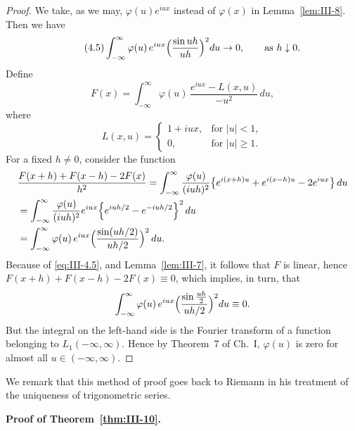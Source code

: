 \begin{proof}
We take, as we may, $\varphi(u)e^{iux}$ instead of $\varphi(x)$ in Lemma~\ref{lem:III-8}. Then we have
\begin{equation}\tag{4.5}\label{eq:III-4.5}
\int_{-\infty}^{\infty}\varphi(u)\,e^{iux}\Bigl(\frac{\sin uh}{uh}\Bigr)^{2}du\to0,\qquad\text{as }h\downarrow0.
\end{equation}
Define
\[
F(x)=\int_{-\infty}^{\infty}\varphi(u)\,\frac{e^{iux}-L(x,u)}{-u^{2}}\,du,
\]
where
\[
L(x,u)=
\begin{cases}
1+iux,&\text{for }|u|<1,\\
0,&\text{for }|u|\ge1.
\end{cases}
\]
For a fixed $h\neq0$, consider the function
\begin{align*}
&\frac{F(x+h)+F(x-h)-2F(x)}{h^{2}}
=\int_{-\infty}^{\infty}\frac{\varphi(u)}{(iuh)^{2}}\bigl\{e^{i(x+h)u}+e^{i(x-h)u}-2e^{iux}\bigr\}\,du\\
&=\int_{-\infty}^{\infty}\frac{\varphi(u)}{(iuh)^{2}}e^{iux}\Bigl\{e^{iuh/2}-e^{-iuh/2}\Bigr\}^{2}\,du\\
&=\int_{-\infty}^{\infty}\varphi(u)\,e^{iux}\Bigl(\frac{\sin(uh/2)}{uh/2}\Bigr)^{2}\,du.
\end{align*}
Because of \eqref{eq:III-4.5}, and Lemma~\ref{lem:III-7}, it follows that $F$ is linear, hence $F(x+h)+F(x-h)-2F(x)\equiv0$, which implies, in turn, that
\[
\int_{-\infty}^{\infty}\varphi(u)\,e^{iux}\Bigl(\frac{\sin\frac{uh}{2}}{uh/2}\Bigr)^{2}du\equiv0.
\]
But the integral on the left-hand side is the Fourier transform of a function belonging to $L_{1}(-\infty,\infty)$. Hence by Theorem~7 of Ch.~I, $\varphi(u)$ is zero for almost all $u\in(-\infty,\infty)$.
\end{proof}

We remark that this method of proof goes back to Riemann in his treatment of the uniqueness of trigonometric series.

\noindent\textbf{Proof of Theorem~\ref{thm:III-10}.}

